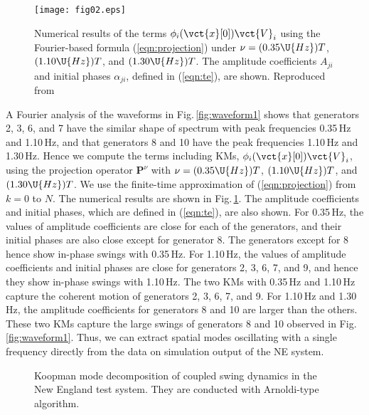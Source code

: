\documentclass[a4paper,10pt]{article}
\def\bP{{\mathbf{P}}}
\begin{document}
%
\begin{figure}[t] %
\begin{center}
\texttt{[image: fig02.eps]}
\caption{%
Numerical results of the terms $\phi_i(\vct{x}[0])\vct{V}_i$ using the Fourier-based formula (\ref{eqn:projection}) under $\nu=(0.35\U{Hz})T$, $(1.10\U{Hz})T$, and $(1.30\U{Hz})T$.  
The amplitude coefficients $A_{ji}$ and initial phases $\alpha_{ji}$, defined in (\ref{eqn:te}), are shown. 
Reproduced from \cite{Susuki_IEEETPWRS26}
}%
\label{fig:KM5}
\end{center}
\end{figure}

%
A Fourier analysis of the waveforms in Fig.\,\ref{fig:waveform1} shows that generators 2, 3, 6, and 7 have the similar shape of spectrum with peak frequencies 0.35\,Hz and 1.10\,Hz, and that generators 8 and 10 have the peak frequencies 1.10\,Hz and 1.30\,Hz.  
Hence we compute the terms including KMs, $\phi_i(\vct{x}[0])\vct{V}_i$, using the projection operator $\bP^\nu$ with $\nu=(0.35\U{Hz})T$, $(1.10\U{Hz})T$, and $(1.30\U{Hz})T$.  
We use the finite-time approximation of (\ref{eqn:projection}) from $k=0$ to $N$.  
The numerical results are shown in Fig.\,\ref{fig:KM5}.  
The amplitude coefficients and initial phases, which are defined in (\ref{eqn:te}), are also shown.  
For 0.35\,Hz, the values of amplitude coefficients are close for each of the generators, and their initial phases are also close except for generator 8.  
The generators except for 8 hence show in-phase swings with 0.35\,Hz.  
For 1.10\,Hz, the values of amplitude coefficients and initial phases are close for generators 2, 3, 6, 7, and 9, and hence they show in-phase swings with 1.10\,Hz.  
The two KMs with 0.35\,Hz and 1.10\,Hz capture the coherent motion of generators 2, 3, 6, 7, and 9.  For 1.10\,Hz and 1.30\,Hz, the amplitude coefficients for generators 8 and 10 are larger than the others.  
These two KMs capture the large swings of generators 8 and 10 observed in Fig.\,\ref{fig:waveform1}.  
Thus, we can extract spatial modes oscillating with a single frequency directly from the data on  simulation output of the NE system.  

%
\begin{figure*}[t] %
\centering
{}%
%
\hspace*{12mm}
%
%
\caption{%
Koopman mode decomposition of coupled swing dynamics in the New England test system.  
They are conducted with Arnoldi-type algorithm.}%
\end{figure*}
\end{document}
